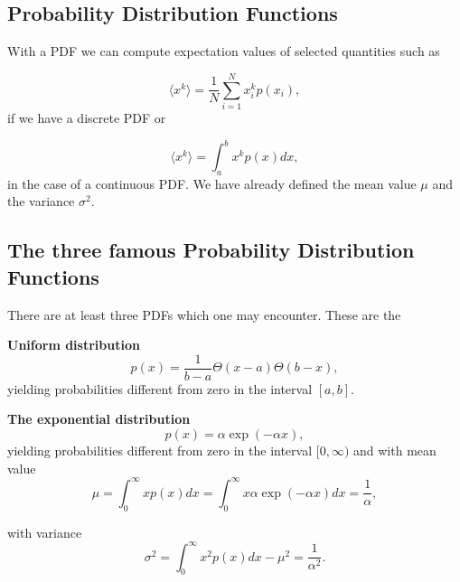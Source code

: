 \documentclass[%
oneside,                 %
final,                   %
10pt]{article}
\newenvironment{block_mdfboxadmon}[1][]{
\begin{block_mdfboxmdframed}[frametitle=#1]
}
{
\end{block_mdfboxmdframed}
}
\begin{document}
\subsection{Probability Distribution Functions}

\begin{block_mdfboxadmon}[]
With a PDF we can compute expectation values of selected quantities such as

\begin{equation*}
    \langle x^k\rangle=\frac{1}{N}\sum_{i=1}^{N}x_i^kp(x_i),
\end{equation*}
if we have a discrete PDF or

\begin{equation*}
    \langle x^k\rangle=\int_a^b x^kp(x)dx,
\end{equation*}
in the case of a continuous PDF. We have already defined the mean value $\mu$
and the variance $\sigma^2$.
\end{block_mdfboxadmon} %



\subsection{The three famous Probability Distribution Functions}

\begin{block_mdfboxadmon}[]

There are at least three PDFs which one may encounter. These are the

\textbf{Uniform distribution}  
\begin{equation*}   
p(x)=\frac{1}{b-a}\Theta(x-a)\Theta(b-x),
\end{equation*}
yielding probabilities different from zero in the interval $[a,b]$.

\textbf{The exponential distribution}
\begin{equation*}   
p(x)=\alpha \exp{(-\alpha x)},
\end{equation*}
yielding probabilities different from zero in the interval $[0,\infty)$ and with mean value
\begin{equation*} 
\mu = \int_0^{\infty}xp(x)dx=\int_0^{\infty}x\alpha \exp{(-\alpha x)}dx=\frac{1}{\alpha},
\end{equation*}
\end{block_mdfboxadmon} %


with variance
\begin{equation*}
\sigma^2=\int_0^{\infty}x^2p(x)dx-\mu^2 = \frac{1}{\alpha^2}.
\end{equation*}
\end{document}
